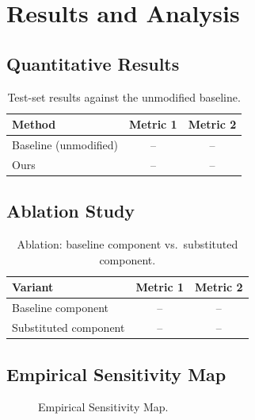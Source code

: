 \section{Results and Analysis}
\label{sec:results}

\subsection{Quantitative Results}
\label{sec:results-quant}

\begin{table}[t]
  \centering
  \caption{Test-set results against the unmodified baseline. }
  \label{tab:main}
  \begin{tabular}{lcc}
    \toprule
    Method & Metric 1 & Metric 2 \\
    \midrule
    Baseline (unmodified) & -- & -- \\
    Ours & -- & -- \\
    \bottomrule
  \end{tabular}
\end{table}


\subsection{Ablation Study}
\label{sec:results-ablation}

\begin{table}[t]
  \centering
  \caption{Ablation: baseline component vs.\ substituted component.}
  \label{tab:ablation}
  \begin{tabular}{lcc}
    \toprule
    Variant & Metric 1 & Metric 2 \\
    \midrule
    Baseline component & -- & -- \\
    Substituted component & -- & -- \\
    \bottomrule
  \end{tabular}
\end{table}


\subsection{Empirical Sensitivity Map}
\label{sec:results-sensitivity}

\begin{figure}[t]
  \centering
  \placeholderfig{2.5in}
  \caption{Empirical Sensitivity Map. }
  \label{fig:sensitivity}
\end{figure}

